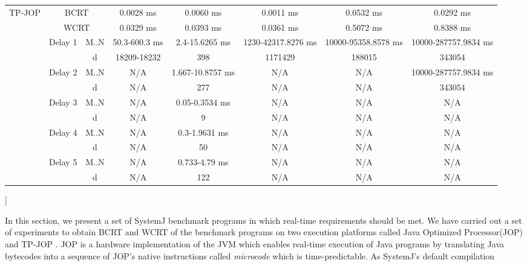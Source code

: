 \begin{table}[t]
\begin{@twocolumnfalse}
{\begin{tabular}{|c| c | c | c | c | c | c | c |}
	\multirow{12}{*}{TP-JOP} 	& \multicolumn{2}{|c|}{BCRT} 		&0.0028 ms 		& 0.0060 ms		  & 0.0011 ms		  & 0.0532 ms		   & 0.0292 ms\\ \cline{2-8}   
								& \multicolumn{2}{|c|}{WCRT} 		&0.0329 ms 		& 0.0393 ms		  & 0.0361 ms		  & 0.5072 ms		   & 0.8388 ms\\ \cline{2-8} 
								& \multirow{2}{*}{Delay 1}	 & M..N &50.3-600.3 ms 	& 2.4-15.6265 ms  & 1230-42317.8276 ms& 10000-95358.8578 ms& 10000-287757.9834 ms \\ \cline{3-8} 
								&			   & d			 		&18209-18232 	& 398 			  & 1171429			  & 188015		       &343054\\ \cline{2-8}
								& \multirow{2}{*}{Delay 2}	 & M..N & 	N/A 		& 1.667-10.8757 ms& N/A				  & N/A 			   &10000-287757.9834 ms\\ \cline{3-8} 
								&			   & d			 		& 	N/A	 		& 277			  & N/A				  & N/A       		   &343054\\ \cline{2-8}
								& \multirow{2}{*}{Delay 3}	 & M..N & 	N/A	 		& 0.05-0.3534 ms  & N/A				  & N/A       		   &N/A\\ \cline{3-8} 
								&			   & d			 		& 	N/A	 		& 9		      	  &	N/A				  & N/A       		   &N/A\\ \cline{2-8}
								& \multirow{2}{*}{Delay 4}	 & M..N & 	N/A	 		& 0.3-1.9631 ms   & N/A				  &	N/A       		   &N/A\\ \cline{3-8} 
								&			   & d				 	& 	N/A	 		& 50			  & N/A				  &	N/A      		   &N/A\\ \cline{2-8}
								& \multirow{2}{*}{Delay 5}	 & M..N & 	N/A	 		& 0.733-4.79 ms   & N/A				  &	N/A      		   &N/A\\ \cline{3-8} 
								&			   & d			 		& 	N/A	 		& 122 			  &	N/A				  & N/A      		   &N/A\\ \cline{2-8}
	\hline
\end{tabular}
}
\end{@twocolumnfalse}
]

\end{table}
In this section, we present a set of SystemJ benchmark programs in which real-time requirements should be met.
We have carried out a set of experiments to obtain BCRT and WCRT of the benchmark programs on two execution platforms called Java Optimized Processor(JOP) 
\cite{jop:jnl:jsa2007} and TP-JOP \cite{6119095}. JOP is a hardware implementation of the JVM which enables real-time execution of Java programs by translating
Java bytecodes into a sequence of JOP's native instructions called \emph{microcode} which is time-predictable. As SystemJ's default compilation
